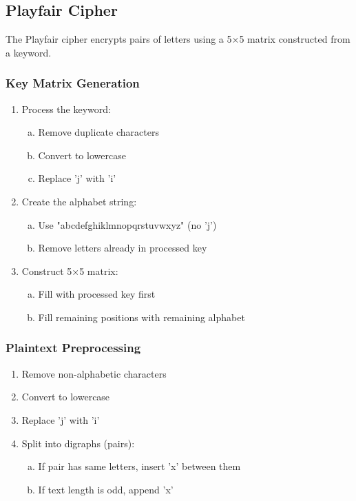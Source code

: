 \documentclass[titlepage]{article}
\begin{document}
\subsection{Playfair Cipher}
The Playfair cipher encrypts pairs of letters using a 5×5 matrix constructed from a keyword.

\subsubsection{ Key Matrix Generation}
\begin{enumerate}[1.]
\item Process the keyword:
   \begin{enumerate}[a)]
   \item Remove duplicate characters
   \item Convert to lowercase
   \item Replace 'j' with 'i'
   \end{enumerate}
\item Create the alphabet string:
   \begin{enumerate}[a)]
   \item Use "abcdefghiklmnopqrstuvwxyz" (no 'j')
   \item Remove letters already in processed key
   \end{enumerate}
\item Construct 5×5 matrix:
   \begin{enumerate}[a)]
   \item Fill with processed key first
   \item Fill remaining positions with remaining alphabet
   \end{enumerate}
\end{enumerate}

\subsubsection{Plaintext Preprocessing}
\begin{enumerate}[1.]
\item Remove non-alphabetic characters
\item Convert to lowercase
\item Replace 'j' with 'i'
\item Split into digraphs (pairs):
   \begin{enumerate}[a)]
   \item If pair has same letters, insert 'x' between them
   \item If text length is odd, append 'x'
   \end{enumerate}
\end{enumerate}
\end{document}
